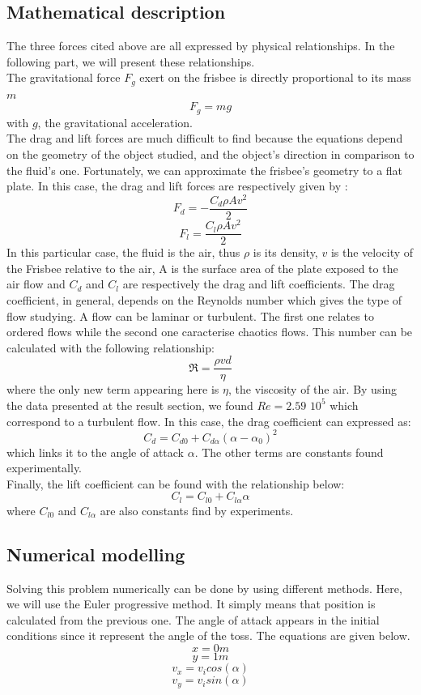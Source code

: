 \documentclass[10pt,a4paper]{report}
\begin{document}
\subsection{Mathematical description}
The three forces cited above are all expressed by physical relationships. In the following part, we will present these relationships.
\\The gravitational force $F_g$ exert on the frisbee is directly proportional to its mass $m$
\[F_g = m g\]
with $g$, the gravitational acceleration.
\\
The drag and lift forces are much difficult to find because the equations depend on the geometry of the object studied, and the object's direction in comparison to the fluid's one. Fortunately, we can approximate the frisbee's geometry to a flat plate. In this case, the drag and lift forces are respectively given by :
\[F_d = -\frac{C_d \rho A  v^2}{2}\]
\[F_l = \frac{C_l \rho A  v^2}{2}\]
In this particular case, the fluid is the air, thus $\rho$ is its density, $v$ is the velocity of the Frisbee relative to the air, A is the surface area of the plate exposed to the air flow and $C_d$ and $C_l$ are respectively the drag and lift coefficients.
The drag coefficient, in general, depends on the Reynolds number which gives the type of flow studying. A flow can be laminar or turbulent. The first one relates to ordered flows while the second one caracterise chaotics flows. This number can be calculated with the following relationship:
\[\Re = \frac{\rho v d}{\eta}\]
where the only new term appearing here is $\eta$, the viscosity of the air.
By using the data presented at the result section, we found $Re=2.59$ $10^5$ which correspond to a turbulent flow.
In this case, the drag coefficient can expressed as:
\[C_d = C_{d0} + C_{d\alpha}(\alpha-\alpha_0)^2\]
\cite{art5}
which links it to the angle of attack $\alpha$. The other terms are constants found experimentally.
\\Finally, the lift coefficient can be found with the relationship below:
\[C_l = C_{l0} + C_{l \alpha} \alpha\]
\cite{art5}
where $C_{l0}$ and $C_{l\alpha}$ are also constants find by experiments.
\subsection{Numerical modelling}
Solving this problem numerically can be done by using different methods. Here, we will use the Euler progressive method. It simply means that position is calculated from the previous one.
The angle of attack appears in the initial conditions since it represent the angle of the toss. The equations are given below.
\[x = 0 m\]
\[y = 1 m\]
\[v_x = v_i cos(\alpha) \]
\[v_y = v_i sin(\alpha) \] 
\cite{art5}
\end{document}
